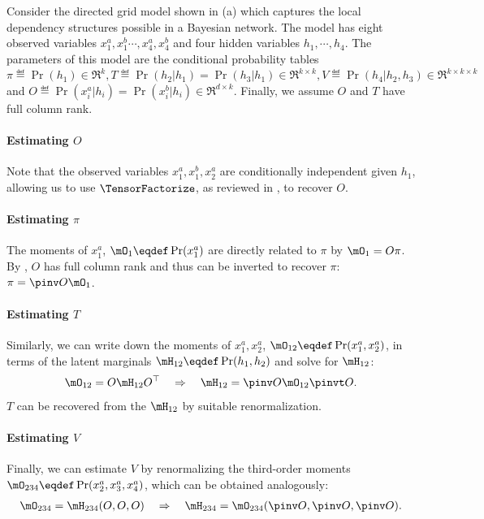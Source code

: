 Consider the directed grid model shown in (a) which
  captures the local dependency structures possible in
  a Bayesian network.
The model has eight observed variables $x^a_1, x^b_1 \cdots, x^a_4, x^b_4$ and four
  hidden variables $h_1, \cdots, h_4$.
The parameters of this model are the conditional probability tables
$\pi \eqdef \Pr(h_1) \in \Re^k, T \eqdef \Pr(h_2 | h_1) = \Pr(h_3 | h_1) \in \Re^{k \times k},
V \eqdef \Pr(h_4 | h_2, h_3) \in \Re^{k \times k \times k}$ and $O \eqdef \Pr(x^a_i | h_i)
=  \Pr(x^b_i | h_i) \in \Re^{d \times k}$. 
Finally, we assume $O$ and $T$ have full column rank.

\paragraph{Estimating $O$}
Note that the observed variables $x^a_1, x^b_1, x^a_2$ are
  conditionally independent given $h_1$, allowing us to use
  $\TensorFactorize$, as reviewed in , to recover
  $O$.

\paragraph{Estimating $\pi$}
The moments of $x^a_1$, $\mO_1 \eqdef \Pr(x^a_1)$ are directly related to
  $\pi$ by $\mO_1 = O \pi$. 
By , $O$ has full column rank and thus can be
  inverted to recover $\pi$: $\pi = \pinv O \mO_1$.

\paragraph{Estimating $T$}
Similarly, we can write down the moments of $x^a_1, x^a_2$, $\mO_{12}
  \eqdef \Pr(x^a_1, x^a_2)$, in terms of the latent marginals $\mH_{12}
  \eqdef \Pr(h_1, h_2)$ and solve for $\mH_{12}$:
\begin{align*}
\mO_{12} = O \mH_{12} O^\top \quad\Rightarrow\quad
  \mH_{12} = \pinv O \mO_{12} \pinvt O.
\end{align*}
$T$ can be recovered from the $\mH_{12}$ by suitable renormalization.

\paragraph{Estimating $V$}
Finally, we can estimate $V$ by renormalizing the third-order moments $\mO_{234} \eqdef \Pr(x^a_2, x^a_3, x^a_4)$,
which can be obtained analogously:
\begin{align*}
  \mO_{234} = \mH_{234}(O, O, O) \quad\Rightarrow\quad
  \mH_{234} = \mO_{234}(\pinv O, \pinv O, \pinv O).
\end{align*}

